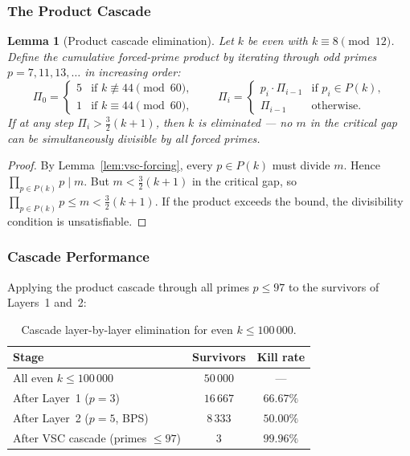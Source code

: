 \documentclass[12pt,a4paper]{article}
\theoremstyle{plain}
\newtheorem{lemma}[theorem]{Lemma}
\theoremstyle{definition}
\begin{document}
\subsubsection{The Product Cascade}

\begin{lemma}[Product cascade elimination]\label{lem:product-cascade}
  Let $k$ be even with $k \equiv 8 \pmod{12}$.  Define the cumulative
  forced-prime product by iterating through odd primes $p = 7, 11, 13,
  \dots$ in increasing order:
  \[\label{eq:cum-prod}
    \Pi_0 = \begin{cases}
      5 & \text{if } k \not\equiv 44 \pmod{60},\\
      1 & \text{if } k \equiv 44 \pmod{60},
    \end{cases}
    \qquad
    \Pi_{i} = \begin{cases}
      p_i \cdot \Pi_{i-1} & \text{if } p_i \in P(k),\\
      \Pi_{i-1} & \text{otherwise}.
    \end{cases}
  \]
  If at any step $\Pi_i > \frac{3}{2}(k+1)$, then $k$ is eliminated ---
  no $m$ in the critical gap can be simultaneously divisible by all
  forced primes.
\end{lemma}

\begin{proof}
  By Lemma~\ref{lem:vsc-forcing}, every $p \in P(k)$ must divide $m$.
  Hence $\prod_{p \in P(k)} p \mid m$.  But $m < \frac{3}{2}(k+1)$ in
  the critical gap, so $\prod_{p \in P(k)} p \le m < \frac{3}{2}(k+1)$.
  If the product exceeds the bound, the divisibility condition is
  unsatisfiable.
\end{proof}

\subsubsection{Cascade Performance}

Applying the product cascade through all primes $p \le 97$ to the
survivors of Layers~1 and~2:

\begin{table}[htbp]
\centering
\caption{Cascade layer-by-layer elimination for even $k \le 100\,000$.}
\label{tab:vsc-cascade}
\begin{tabular}{lcc}
\toprule
\textbf{Stage} & \textbf{Survivors} & \textbf{Kill rate} \\
\midrule
All even $k \le 100\,000$ & $50\,000$ & --- \\
After Layer~1 ($p = 3$) & $16\,667$ & $66.67\%$ \\
After Layer~2 ($p = 5$, BPS) & $8\,333$ & $50.00\%$ \\
After VSC cascade (primes $\le 97$) & $3$ & $99.96\%$ \\
\bottomrule
\end{tabular}
\end{table}
\end{document}
